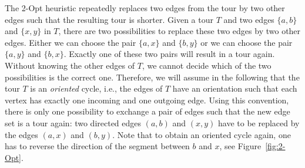 \documentclass[a4paper, 11pt]{article}
\def\2opt{2-Opt heuristic}
\begin{document}
The \2opt repeatedly replaces two edges from the tour by two other edges such that the resulting tour is shorter.
Given a tour $T$ and two edges $\{a,b\}$ and $\{x,y\}$ in $T$, there are two possibilities to replace these two edges by two other edges.
Either we can choose the pair $\{a,x\}$ and $\{b,y\}$ or we can choose the pair $\{a,y\}$ and $\{b,x\}$. Exactly one of these two pairs
will result in a tour again. Without knowing the other edges of $T$, we cannot decide which of the two possibilities is the correct one.
Therefore, we will assume in the following that the tour $T$ is an \emph{oriented} cycle, i.e., the edges of $T$ have an orientation 
such that each vertex has exactly one incoming and one outgoing edge. Using this convention, there is only one possibility to
exchange a pair of edges such that the new edge set is a tour again: two directed edges $(a,b)$ and $(x,y)$ have to be replaced by
the edges $(a,x)$ and $(b,y)$. Note that to obtain an oriented cycle again, one has to reverse the direction of the segment between $b$ and $x$, 
see Figure~\ref{fig:2-Opt}.
\end{document}
